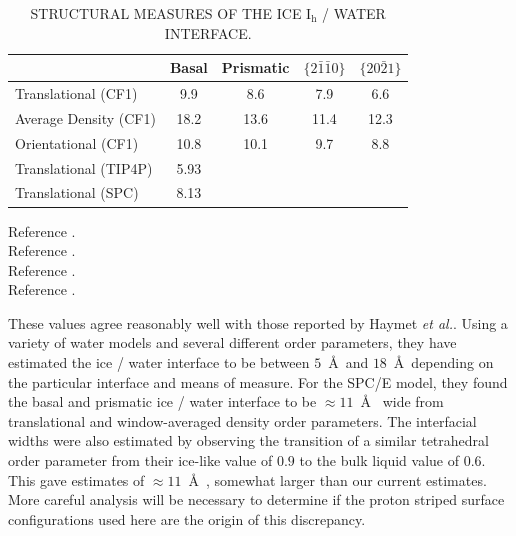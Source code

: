 \begin{table}[h]
\centering
\caption{STRUCTURAL MEASURES OF THE ICE I$_\mathrm{h}$ / WATER
  INTERFACE. \label{tab:structCompare}} 
\begin{tabular}{|l|cccc|}  
\hline
& Basal & Prismatic & $\{2\bar{1}\bar{1}0\}$ & $\{20\bar{2}1\}$ \\
\hline
Translational (CF1)\footnotemark[1] & 9.9 & 8.6  & 7.9 & 6.6 \\
Average Density (CF1)\footnotemark[1] & 18.2 & 13.6 & 11.4 & 12.3 \\
Orientational (CF1)\footnotemark[2] & 10.8 & 10.1 & 9.7 & 8.8 \\
Translational (TIP4P)\footnotemark[3] & 5.93 & & & \\
Translational (SPC)\footnotemark[4] & 8.13 & & & \\
\hline
\end{tabular}
\flushleft
  \footnotemark[1]\footnotesize{Reference \cite{Hayward2001}.} \\
  \footnotemark[2]\footnotesize{Reference \cite{Hayward2002}.} \\
  \footnotemark[3]\footnotesize{Reference \cite{Karim1988}.} \\
  \footnotemark[4]\footnotesize{Reference \cite{Karim1990}.} \\
\end{table}








These values agree reasonably well with those reported by Haymet
\textit{et
  al.}.\cite{Karim1988,Karim1990,Hayward2001,Bryk2002,Hayward2002,Bryk2004}
Using a variety of water models and several different order
parameters, they have estimated the ice / water interface to be
between $5$~\AA~and $18$~\AA~depending on the particular interface and
means of measure.  For the SPC/E model, they found the basal and
prismatic ice / water interface to be $\approx 11$~\AA~ wide from
translational and window-averaged density order parameters. The
interfacial widths were also estimated by observing the transition of
a similar tetrahedral order parameter from their ice-like value of
$0.9$ to the bulk liquid value of $0.6$. This gave estimates of
$\approx 11$~\AA~, somewhat larger than our current estimates. More
careful analysis will be necessary to determine if the proton striped
surface configurations used here are the origin of this discrepancy.

